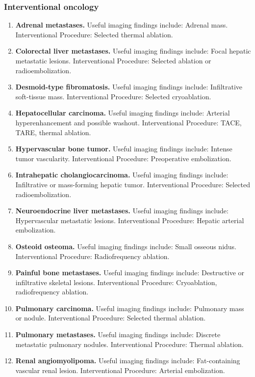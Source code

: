 \subsubsection{Interventional oncology}
\begin{enumerate}[leftmargin=*,itemsep=0.45em,topsep=0.4em]
\item \textbf{Adrenal metastases.} Useful imaging findings include: Adrenal mass. Interventional Procedure: Selected thermal ablation.
\item \textbf{Colorectal liver metastases.} Useful imaging findings include: Focal hepatic metastatic lesions. Interventional Procedure: Selected ablation or radioembolization.
\item \textbf{Desmoid-type fibromatosis.} Useful imaging findings include: Infiltrative soft-tissue mass. Interventional Procedure: Selected cryoablation.
\item \textbf{Hepatocellular carcinoma.} Useful imaging findings include: Arterial hyperenhancement and possible washout. Interventional Procedure: TACE, TARE, thermal ablation.
\item \textbf{Hypervascular bone tumor.} Useful imaging findings include: Intense tumor vascularity. Interventional Procedure: Preoperative embolization.
\item \textbf{Intrahepatic cholangiocarcinoma.} Useful imaging findings include: Infiltrative or mass-forming hepatic tumor. Interventional Procedure: Selected radioembolization.
\item \textbf{Neuroendocrine liver metastases.} Useful imaging findings include: Hypervascular metastatic lesions. Interventional Procedure: Hepatic arterial embolization.
\item \textbf{Osteoid osteoma.} Useful imaging findings include: Small osseous nidus. Interventional Procedure: Radiofrequency ablation.
\item \textbf{Painful bone metastases.} Useful imaging findings include: Destructive or infiltrative skeletal lesions. Interventional Procedure: Cryoablation, radiofrequency ablation.
\item \textbf{Pulmonary carcinoma.} Useful imaging findings include: Pulmonary mass or nodule. Interventional Procedure: Selected thermal ablation.
\item \textbf{Pulmonary metastases.} Useful imaging findings include: Discrete metastatic pulmonary nodules. Interventional Procedure: Thermal ablation.
\item \textbf{Renal angiomyolipoma.} Useful imaging findings include: Fat-containing vascular renal lesion. Interventional Procedure: Arterial embolization.

\end{enumerate}

